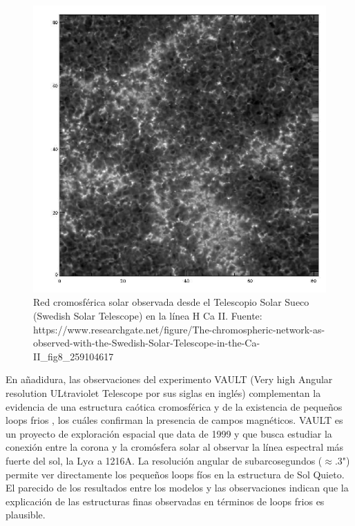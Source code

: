 \documentclass[9pt]{book}
\begin{document}
\begin{figure}[h]

\centering
\includegraphics[scale=0.5]{chromospheric_network2}
\caption{ Red cromosf\'erica solar observada desde el Telescopio Solar Sueco (Swedish Solar Telescope) en la l\'inea H Ca II.
\newline Fuente: https://www.researchgate.net/figure/The-chromospheric-network-as-observed-with-the-Swedish-Solar-Telescope-in-the-Ca-II\_fig8\_259104617}
\label{chromospheric_network2}
\end{figure}


En a\~nadidura, las  observaciones del experimento VAULT (Very high Angular resolution ULtraviolet Telescope por sus siglas en ingl\'es) complementan la evidencia de una estructura ca\'otica cromosf\'erica y de la existencia de peque\~nos loops frios \cite{VAULT1}, los cu\'ales confirman la presencia de campos magn\'eticos.
VAULT es un proyecto de exploraci\'on espacial que data de 1999 y que busca estudiar la conexi\'on entre la corona y la crom\'osfera solar al observar la l\'inea espectral m\'as fuerte del sol, la Ly$\alpha$ a 1216A.
La resoluci\'on angular de subarcosegundos ($\approx$.3") permite ver directamente los peque\~nos loops f\'ios en la estructura de Sol Quieto. El parecido de los resultados entre los modelos y las observaciones indican que la explicaci\'on de las estructuras finas observadas en t\'erminos de loops frios es plausible.
\end{document}
